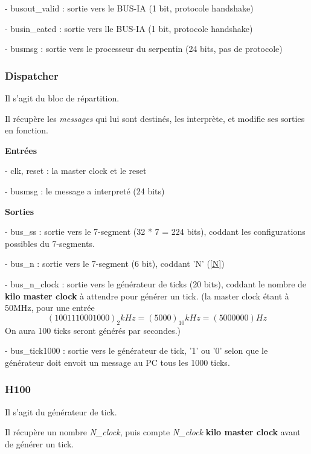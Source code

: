 \documentclass[10pt]{article}
\begin{document}
            - busout\_valid : sortie vers le BUS-IA (1 bit, protocole handshake)
           
            - busin\_eated : sortie vers lle BUS-IA (1 bit, protocole handshake)

            - busmsg : sortie vers le processeur du serpentin (24 bits, pas de protocole)


        
        \subsubsection{Dispatcher}
        
        Il s'agit du bloc de répartition.
                
        Il récupère les \textit{messages} qui lui sont destinés,
        les interprète, et modifie ses sorties en fonction.
        
        \textbf{Entrées}
        
            - clk, reset : la master clock et le reset
            
            - busmsg : le message a interpreté (24 bits)
                            
        \textbf{Sorties}
            
            - bus\_ss : sortie vers le 7-segment (32 * 7 = 224 bits), coddant les configurations possibles du 7-segments.
           
            - bus\_n : sortie vers le 7-segment (6 bit), coddant 'N' (\ref{N})

            - bus\_n\_clock : sortie vers le générateur de ticks (20 bits), coddant le nombre de \textbf{kilo master clock} à attendre pour générer un tick. (la master clock étant à 50MHz, pour une entrée
            $$(1001110001000)_2 kHz = (5000)_{10} kHz = (5000000) Hz$$
            On aura 100 ticks seront générés par secondes.)
            
            - bus\_tick1000 : sortie vers le générateur de tick, '1' ou '0' selon que le générateur doit envoit un message au PC tous les 1000 ticks.

        
        \subsubsection{H100}
        
        Il s'agit du générateur de tick.
                
        Il récupère un nombre \textit{N\_clock}, puis compte \textit{N\_clock} \textbf{kilo master clock}
        avant de générer un tick.
        
\end{document}
